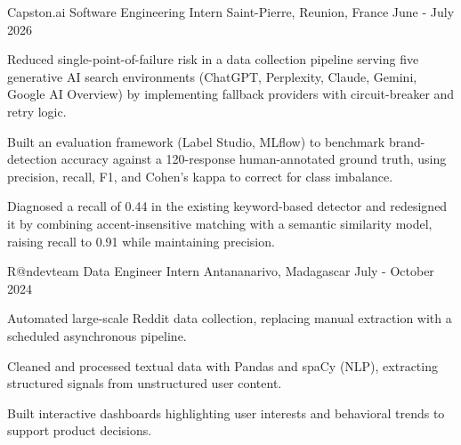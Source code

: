 

\begin{cventries}

\cventry
  {Capston.ai} %
  {Software Engineering Intern} %
  {Saint-Pierre, Reunion, France} %
  {June - July 2026} %
  {
    \begin{cvitems} %
      \item {Reduced single-point-of-failure risk in a data collection pipeline serving five generative AI search environments (ChatGPT, Perplexity, Claude, Gemini, Google AI Overview) by implementing fallback providers with circuit-breaker and retry logic.}
      \item {Built an evaluation framework (Label Studio, MLflow) to benchmark brand-detection accuracy against a 120-response human-annotated ground truth, using precision, recall, F1, and Cohen's kappa to correct for class imbalance.}
      \item {Diagnosed a recall of 0.44 in the existing keyword-based detector and redesigned it by combining accent-insensitive matching with a semantic similarity model, raising recall to 0.91 while maintaining precision.}
    \end{cvitems}
  }

\cventry
  {R@ndevteam} %
  {Data Engineer Intern} %
  {Antananarivo, Madagascar} %
  {July - October 2024} %
  {
    \begin{cvitems} %
      \item {Automated large-scale Reddit data collection, replacing manual extraction with a scheduled asynchronous pipeline.}
      \item {Cleaned and processed textual data with Pandas and spaCy (NLP), extracting structured signals from unstructured user content.}
      \item {Built interactive dashboards highlighting user interests and behavioral trends to support product decisions.}
    \end{cvitems}
  }
\end{cventries}
